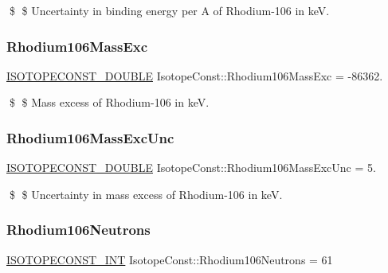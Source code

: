 \$ \$ Uncertainty in binding energy per A of Rhodium-\/106 in keV. \mbox{\label{group___isotope_const-_rhodium-_rh106_ga0bca150c966bef7c6fe67f761bf6a2f7}} 
\subsubsection{\texorpdfstring{Rhodium106\+Mass\+Exc}{Rhodium106MassExc}}
{\footnotesize\ttfamily \mbox{\hyperlink{group___isotope_const-_macros_ga8f45a7272ce02c0b4c65c44636ed719a}{I\+S\+O\+T\+O\+P\+E\+C\+O\+N\+S\+T\+\_\+\+D\+O\+U\+B\+LE}} Isotope\+Const\+::\+Rhodium106\+Mass\+Exc = -\/86362.}

\$ \$ Mass excess of Rhodium-\/106 in keV. \mbox{\label{group___isotope_const-_rhodium-_rh106_gaae2ccd11852d349f0bac85eb86633050}} 
\subsubsection{\texorpdfstring{Rhodium106\+Mass\+Exc\+Unc}{Rhodium106MassExcUnc}}
{\footnotesize\ttfamily \mbox{\hyperlink{group___isotope_const-_macros_ga8f45a7272ce02c0b4c65c44636ed719a}{I\+S\+O\+T\+O\+P\+E\+C\+O\+N\+S\+T\+\_\+\+D\+O\+U\+B\+LE}} Isotope\+Const\+::\+Rhodium106\+Mass\+Exc\+Unc = 5.}

\$ \$ Uncertainty in mass excess of Rhodium-\/106 in keV. \mbox{\label{group___isotope_const-_rhodium-_rh106_gaee72e07df9964de0cf49ca08cf4e73ff}} 
\subsubsection{\texorpdfstring{Rhodium106\+Neutrons}{Rhodium106Neutrons}}
{\footnotesize\ttfamily \mbox{\hyperlink{group___isotope_const-_macros_ga5f18360b3e99483a35c32d789e62621c}{I\+S\+O\+T\+O\+P\+E\+C\+O\+N\+S\+T\+\_\+\+I\+NT}} Isotope\+Const\+::\+Rhodium106\+Neutrons = 61}

